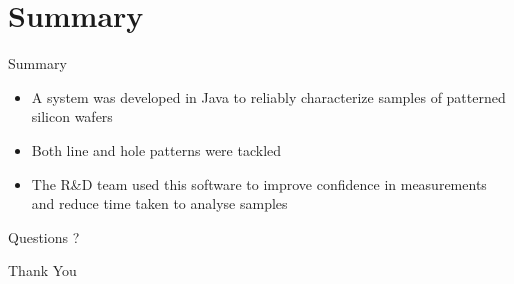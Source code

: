 \documentclass{beamer}
\begin{document}
\section{Summary}

\begin{frame}{Summary}
	\begin{itemize}
		\item
		A system was developed in Java to reliably characterize samples of patterned silicon wafers
		\item
		Both line and hole patterns were tackled
		\item
		The R\&D team used this software to improve confidence in measurements and reduce time taken to analyse samples
	\end{itemize}
\end{frame}


\begin{frame}
	\centering
		 Questions ?
\end{frame}

\begin{frame}
	\centering
		Thank You
\end{frame}
\end{document}
